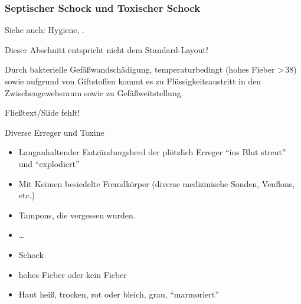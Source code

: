 \subsubsection{Septischer Schock und Toxischer Schock}
\label{topic:schock-septischer}
\label{topic:schock-toxischer}
Siehe auch: Hygiene, .


{Dieser Abschnitt entspricht nicht dem Standard-Layout!}

Durch bakterielle Gefäßwandschädigung, temperaturbedingt (hohes
Fieber {\textgreater}\,38{\textcelsius}) sowie aufgrund von
Giftstoffen kommt es zu Flüssigkeitsaustritt in den Zwischengewebsraum sowie
zu Gefäßweitstellung.

{

   {Fließtext/Slide fehlt!}

Diverse Erreger und Toxine

\begin{itemize}
  \item Langanhaltender Entzündungsherd der plötzlich Erreger
  "`ins Blut streut"' und "`explodiert"'
  \item Mit Keimen besiedelte Fremdkörper (diverse
  medizinische Sonden, Venflons, etc.)
  \item Tampons, die vergessen wurden.
  \item \ldots
\end{itemize}
}{}{}{}{}



{


\begin{itemize}
  \item Schock
  \item hohes Fieber oder kein Fieber
  \item Haut heiß, trocken, rot oder bleich, grau,
  "`marmoriert"'
\end{itemize}
}{}{}{}{}









